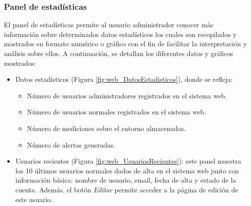 \documentclass[12pt,a4paper, twoside]{report}
\begin{document}
	\subsubsection{Panel de estadísticas}
	
	El panel de estadísticas permite al usuario administrador conocer más información sobre determinados datos estadísticos los cuales son recopilados y mostrados en formato numérico o gráfico con el fin de facilitar la interpretación y análisis sobre ellos. A continuación, se detallan los diferentes datos y gráficos mostrados:
	
	\begin{itemize}
		\item Datos estadísticos (Figura \ref{fig:web_DatosEstadisticos}), donde se refleja:
		\begin{itemize}
			\item Número de usuarios administradores registrados en el sistema web.
			\item Número de usuarios normales registrados en el sistema web.
			\item Número de mediciones sobre el entorno almacenadas.
			\item Número de alertas generadas.
		\end{itemize}
		
		
		\item Usuarios recientes (Figura \ref{fig:web_UsuariosRecientes}): este panel muestra los 10 últimos usuarios normales dados de alta en el sistema web junto con información básica: nombre de usuario, email, fecha de alta y estado de la cuenta. Además, el botón \textit{Editar} permite acceder a la página de edición de este usuario.

		
	\end{itemize}
		
\end{document}
